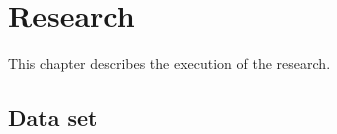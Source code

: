 \chapter{Research}
\label{research}

This chapter describes the execution of the research.

\section{Data set}


\begin{comment}
\section{Data}
The evolution data of 250 OSS projects was gathered from
Ohloh.net\footnote{http://www.ohloh.net}. Ohloh is a project by the initiative
of Black Duck Software\footnote{http://www.blackducksoftware.com}. The Ohloh
universe contains approximately 600,000 open-source software projects in
January 2014. The evolution data of all these projects is tracked and monthly
analyzed by Ohloh.net.

\subsection{Data gathering}
The data was gathered using the tool \emph{OhlohAnalytics }\rm by Magiel
Bruntink \cite{ohlohanalytics}. The tool is created as part of the research
``\emph{An Initial Quality Analysis of the Ohloh Software Evolution Data}\rm''
by M. Bruntink. This tool provides us with an initial data set of more than
10,000 OSS projects gathered in July 2013.\\

\noindent	
The following steps are done in the data gathering process:
\begin{enumerate}
	\item Data collection.
	\item Validation and cleaning.
\end{enumerate}

\subsubsection{Data collection}
During the data collection step the names of the projects tracked by Ohloh are
gathered. Then for each project, monthly analysis facts (so called
\emph{factoids}\rm) are gathered. These facts include: size facts (lines of code
(LOC), blank lines, commented lines), activity facts (number of commits, number
of contributors, LOC added/removed), enlistments (i.e., source code
repositories for the project), and programming languages.


\end{comment}
